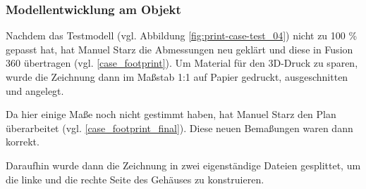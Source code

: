 \subsubsection{Modellentwicklung am Objekt}
Nachdem das Testmodell (vgl. Abbildung \ref{fig:print-case-test_04}) nicht zu 100 \% gepasst hat, hat Manuel Starz die Abmessungen neu geklärt und diese in Fusion 360 übertragen (vgl. \ref{case_footprint}). Um Material für den 3D-Druck zu sparen, wurde die Zeichnung dann im Maßstab 1:1 auf Papier gedruckt, ausgeschnitten und angelegt.\par
Da hier einige Maße noch nicht gestimmt haben, hat Manuel Starz den Plan überarbeitet (vgl. \ref{case_footprint_final}). Diese neuen Bemaßungen waren dann korrekt.\par
Daraufhin wurde dann die Zeichnung in zwei eigenständige Dateien gesplittet, um die linke und die rechte Seite des Gehäuses zu konstruieren.\par
